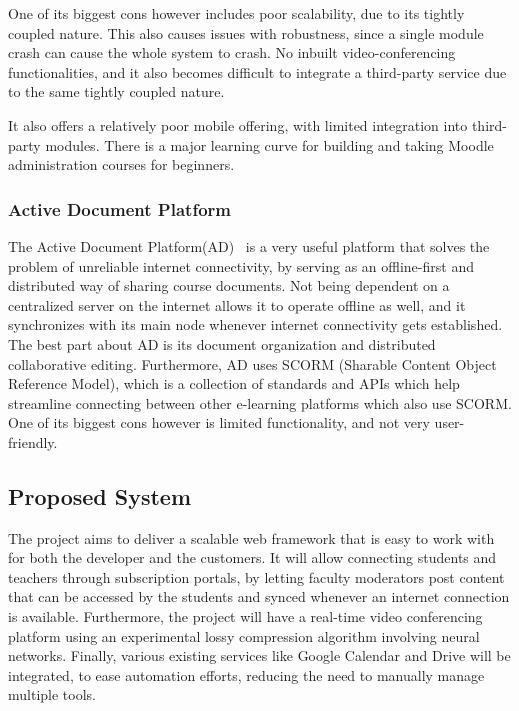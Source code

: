 One of its biggest cons however includes poor scalability, due to its tightly coupled nature. 
This also causes issues with robustness, since a single module crash can cause the whole system to crash. 
No inbuilt video-conferencing functionalities, and it also becomes difficult to integrate a 
third-party service due to the same tightly coupled nature.

It also offers a relatively poor mobile offering, with limited integration into third-party modules. 
There is a major learning curve for building and taking Moodle administration courses for beginners.

\subsubsection{Active Document Platform}
The Active Document Platform(AD)~\cite{ActiveDocument} is a very useful platform that 
solves the problem of unreliable internet connectivity, by serving as an offline-first 
and distributed way of sharing course documents. Not being dependent on a centralized server on the internet allows it to operate offline as well, and it synchronizes with its main node whenever internet connectivity gets established. The best part about AD 
is its document organization and distributed collaborative editing. Furthermore, AD 
uses SCORM (Sharable Content Object Reference Model), which is a collection of standards and APIs which help streamline connecting between other e-learning platforms which also use SCORM. One of its biggest cons however is limited functionality, and not very user-friendly.

\subsection{Proposed System}

The project aims to deliver a scalable web framework that is easy to work with for both the developer and the customers. It will allow connecting students and teachers 
through subscription portals, by letting faculty moderators post content that can be accessed 
by the students and synced whenever an internet connection is available. 
Furthermore, the project will have a real-time video conferencing platform using an experimental lossy compression algorithm involving neural networks. 
Finally, various existing services like Google Calendar and Drive will be integrated, to ease automation efforts, reducing the need to manually manage multiple tools.

